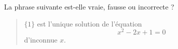 La phrase suivante est-elle vraie, fausse ou incorrecte ?
\begin{quote}
 $\{1\}$ est l'unique solution de l'\'equation 
\begin{displaymath}
 x^2-2x+1=0
\end{displaymath}
d'inconnue $x$.
\end{quote}
\medskip
